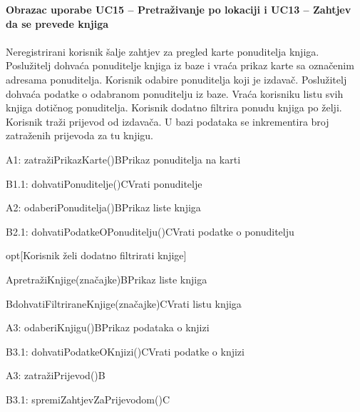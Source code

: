 				\textbf{Obrazac uporabe UC15 – Pretraživanje po lokaciji i UC13 – Zahtjev da se prevede knjiga}\\\\
				Neregistrirani korisnik šalje zahtjev za pregled karte ponuditelja knjiga. Poslužitelj dohvaća ponuditelje knjiga iz baze i vraća prikaz karte sa označenim adresama ponuditelja. Korisnik odabire ponuditelja koji je izdavač. Poslužitelj dohvaća podatke o odabranom ponuditelju iz baze. Vraća korisniku listu svih knjiga dotičnog ponuditelja. Korisnik dodatno filtrira ponudu knjiga po želji. Korisnik traži prijevod od izdavača. U bazi podataka se inkrementira broj zatraženih prijevoda za tu knjigu.\\
				\begin{center}
				\begin{adjustbox}{max width=\textwidth}
					\begin{sequencediagram}
						\begin{call}{A}{1: zatražiPrikazKarte()}{B}{Prikaz ponuditelja na karti}
							\begin{call}{B}{1.1: dohvatiPonuditelje()}{C}{Vrati ponuditelje}
							\end{call}
						\end{call}
						\postlevel
						\begin{call}{A}{2: odaberiPonuditelja()}{B}{Prikaz liste knjiga}
							\begin{call}{B}{2.1: dohvatiPodatkeOPonuditelju()}{C}{Vrati podatke o ponuditelju}
							\end{call}
						\end{call}
						\postlevel
						\begin{sdblock}{opt}{[Korisnik želi dodatno filtrirati knjige]}
							\begin{call}{A}{pretražiKnjige(značajke)}{B}{Prikaz liste knjiga}
								\begin{call}{B}{dohvatiFiltriraneKnjige(značajke)}{C}{Vrati listu knjiga}
								\end{call}
							\end{call}
						\end{sdblock}
						\postlevel
						\begin{call}{A}{3: odaberiKnjigu()}{B}{Prikaz podataka o knjizi}
							\begin{call}{B}{3.1: dohvatiPodatkeOKnjizi()}{C}{Vrati podatke o knjizi} 
							\end{call}
						\end{call}
						\postlevel
						\begin{messcall}{A}{3: zatražiPrijevod()}{B}
							\begin{messcall}{B}{3.1: spremiZahtjevZaPrijevodom()}{C}
							\end{messcall}
						\end{messcall}
						
					\end{sequencediagram}
				\end{adjustbox}
				\end{center}
				\eject
				
